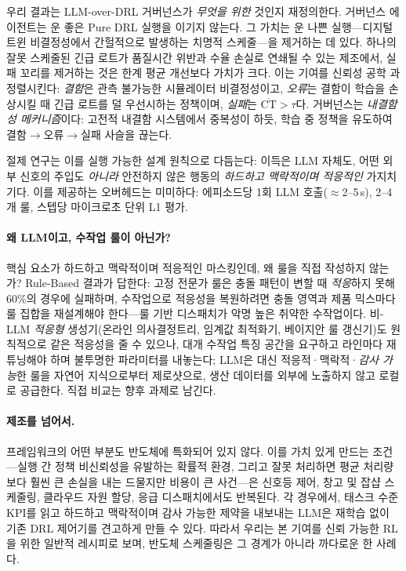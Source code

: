 \documentclass[letterpaper]{article} %
\begin{document}
우리 결과는 LLM-over-DRL 거버넌스가 \emph{무엇을 위한} 것인지 재정의한다. 거버넌스
에이전트는 운 좋은 Pure DRL 실행을 이기지 않는다. 그 가치는 운 나쁜
실행---디지털 트윈 비결정성에서 간헐적으로 발생하는 치명적 스케줄---을 제거하는 데
있다. 하나의 잘못 스케줄된 긴급 로트가 품질시간 위반과 수율 손실로 연쇄될 수 있는
제조에서, 실패 꼬리를 제거하는 것은 한계 평균 개선보다 가치가 크다. 이는 기여를
신뢰성 공학 \citep{avizienis2004}과 정렬시킨다: \emph{결함}은 관측 불가능한
시뮬레이터 비결정성이고, \emph{오류}는 결함이 학습을 손상시킬 때 긴급 로트를 덜
우선시하는 정책이며, \emph{실패}는 $\overline{\mathrm{CT}}>\tau$다. 거버넌스는
\emph{내결함성 메커니즘}이다: 고전적 내결함 시스템에서 중복성이 하듯, 학습 중 정책을
유도하여 결함$\to$오류$\to$실패 사슬을 끊는다.

절제 연구는 이를 실행 가능한 설계 원칙으로 다듬는다: 이득은 LLM 자체도, 어떤 외부
신호의 주입도 \emph{아니라} 안전하지 않은 행동의 \emph{하드하고 맥락적이며 적응적인}
가지치기다. 이를 제공하는 오버헤드는 미미하다: 에피소드당 1회 LLM
호출($\approx$2--5\,s), 2--4개 룰, 스텝당 마이크로초 단위 L1 평가.

\paragraph{왜 LLM이고, 수작업 룰이 아닌가?}
핵심 요소가 하드하고 맥락적이며 적응적인 마스킹인데, 왜 룰을 직접 작성하지 않는가?
Rule-Based 결과가 답한다: 고정 전문가 룰은 충돌 패턴이 변할 때 \emph{적응}하지 못해
60\%의 경우에 실패하며, 수작업으로 적응성을 복원하려면 충돌 영역과 제품 믹스마다 룰
집합을 재설계해야 한다---룰 기반 디스패치가 악명 높은 취약한 수작업이다. 비-LLM \emph{적응형}
생성기(온라인 의사결정트리, 임계값 최적화기, 베이지안 룰 갱신기)도 원칙적으로 같은
적응성을 줄 수 있으나, 대개 수작업 특징 공간을 요구하고 라인마다 재튜닝해야 하며
불투명한 파라미터를 내놓는다; LLM은 대신 적응적·맥락적·\emph{감사 가능}한 룰을 자연어
지식으로부터 제로샷으로, 생산 데이터를 외부에 노출하지 않고 로컬로 공급한다. 직접
비교는 향후 과제로 남긴다.

\paragraph{제조를 넘어서.}
프레임워크의 어떤 부분도 반도체에 특화되어 있지 않다. 이를 가치 있게 만드는
조건---실행 간 정책 비신뢰성을 유발하는 확률적 환경, 그리고 잘못 처리하면 평균
처리량보다 훨씬 큰 손실을 내는 드물지만 비용이 큰 사건---은 신호등 제어, 창고 및 잡샵
스케줄링, 클라우드 자원 할당, 응급 디스패치에서도 반복된다. 각 경우에서, 태스크 수준
KPI를 읽고 하드하고 맥락적이며 감사 가능한 제약을 내보내는 LLM은 재학습 없이 기존 DRL
제어기를 견고하게 만들 수 있다. 따라서 우리는 본 기여를 신뢰 가능한 RL을 위한 일반적
레시피로 보며, 반도체 스케줄링은 그 경계가 아니라 까다로운 한 사례다.
\end{document}
